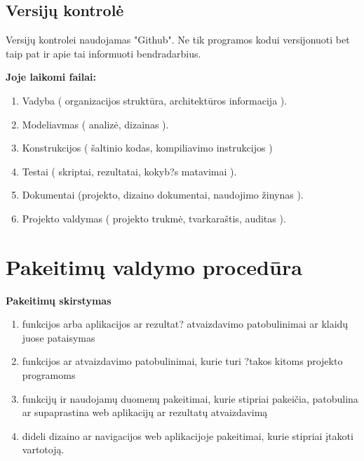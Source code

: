 \documentclass[a4paper,12pt]{article}
\begin{document}
\subsection{Versij\k u kontrol\. e}
Versij\k u kontrolei naudojamas "Github".
Ne tik programos kodui versijonuoti bet taip pat ir apie tai informuoti bendradarbius.

\large\textbf{Joje laikomi failai:}
\normalsize
\begin{enumerate}

	\item Vadyba ( organizacijos strukt\= ura, architekt\= uros informacija ).
	\item Modeliavmas ( analiz\. e, dizainas ).
	\item Konstrukcijos ( \v saltinio kodas, kompiliavimo instrukcijos )
	\item Testai ( skriptai, rezultatai, kokyb?s matavimai ).
	\item Dokumentai (projekto, dizaino dokumentai, naudojimo \v zinynas ).
	\item Projekto valdymas ( projekto trukm\. e, tvarkara\v stis, auditas ).
		
\end{enumerate}
\clearpage 


\section{Pakeitimų valdymo procedūra}

\large\textbf{Pakeitimų skirstymas}
\begin{enumerate}
	\item funkcijos arba aplikacijos ar rezultat? atvaizdavimo patobulinimai ar klaid\k u juose pataisymas
	\item funkcijos ar atvaizdavimo patobulinimai, kurie turi ?takos kitoms projekto programoms
	\item funkcij\k u ir naudojam\k u duomen\k u pakeitimai, kurie stipriai pakei\v cia, patobulina ar supaprastina web aplikacij\k u ar rezultat\k u atvaizdavim\k a
	\item dideli dizaino ar navigacijos web aplikacijoje pakeitimai, kurie stipriai \k itakoti vartotoj\k a.
\end{enumerate}
\end{document}
